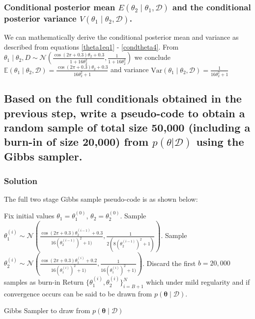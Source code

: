 \documentclass[12pt]{article}
\begin{document}
\subsubsection{Conditional posterior mean \(E(\theta_2 \mid \theta_1, \mathcal{D})\) and the conditional posterior variance \(V(\theta_1 \mid \theta_2, \mathcal{D})\).}

We can mathematically derive the conditional posterior mean and variance as described from equations \ref{theta1eq1} - \ref{condtheta4}.  From $\theta_1 \mid \theta_2, D \sim \mathcal{N} \left( \frac{\cos(2\pi+0.3)\theta_2 + 0.3}{1 + 16\theta_2^2}, \frac{1}{1 + 16\theta_2^2} \right)$ we conclude
$\mathbb{E}(\theta_1 \mid \theta_2, \mathcal{D}) = \frac{\cos(2\pi + 0.3)\theta_2 + 0.3}{16\theta_2^2 + 1}$ and variance  $  \mathrm{Var}(\theta_1 \mid \theta_2, \mathcal{D}) = \frac{1}{16\theta_2^2 + 1}$

\subsection{ Based on the full conditionals obtained in the previous step, write a pseudo-code to obtain a random sample of total size 50,000 (including a burn-in of size 20,000) from $p(\theta | \mathcal{D})$ using the Gibbs sampler.} 
\subsubsection{Solution}


The full two stage Gibbs sample pseudo-code is as shown below:
\begin{algorithm}
\begin{algorithmic}[1]
\State Fix initial values \( \theta_1 = \theta_1^{(0)} \), \( \theta_2 = \theta_2^{(0)} \).
    \State Sample \( \theta_1^{(i)} \sim \mathcal{N}\left(\frac{\cos(2\pi + 0.3)\theta_2^{(i-1)} + 0.3}{16(\theta_2^{(i-1)})^2 + 1)}, \frac{1}{2(8(\theta_2^{(i-1)})^2 + 1)}\right) \).
    \State Sample \( \theta_2^{(i)} \sim \mathcal{N}\left(\frac{\cos(2\pi + 0.3)\theta_1^{(i)} + 0.2}{16(\theta_1^{(i)})^2 + 1)}, \frac{1}{16(\theta_1^{(i)})^2 + 1)}\right) \).
\EndFor
\State Discard the first \( b = 20,000 \) samples as burn-in
\State Return \( \{\theta_1^{(i)}, \theta_2^{(i)}\}_{i=B+1}^{N} \) which under mild regularity and if convergence occurs can be said to be drawn from \( p(\boldsymbol{\theta} \mid \mathcal{D}) \).
\end{algorithmic}
\caption{ Gibbs Sampler to draw from \( p(\boldsymbol{\theta} \mid \mathcal{D}) \)}
\label{algo:gs}
\end{algorithm}
\end{document}
